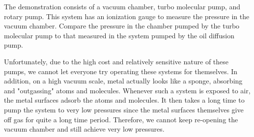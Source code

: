 The demonstration consists of a vacuum chamber, turbo molecular pump, and rotary pump. This system has an ionization gauge to measure the pressure in the vacuum chamber.  Compare the pressure in the chamber pumped by the turbo molecular pump to that measured in the system pumped by the oil diffusion pump. 

Unfortunately, due to the high cost and relatively sensitive nature of these pumps, we cannot let everyone try operating these systems for themselves. In addition, on a high vacuum scale, metal actually looks like a sponge, absorbing and "outgassing" atoms and molecules.  Whenever such a system is exposed to air, the metal surfaces adsorb the atoms and molecules.  It then takes a long time to pump the system to very low pressures since the metal surfaces themselves give off gas for quite a long time period. Therefore, we cannot keep re-opening the vacuum chamber and still achieve very low pressures. 



\AtEndDocument{\clearpage\ifodd\value{page}\else\null\clearpage\fi} %



